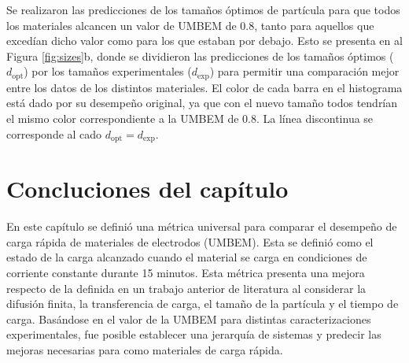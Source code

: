 Se realizaron las predicciones de los tamaños óptimos de partícula para que todos 
los materiales alcancen un valor de UMBEM de 0.8, tanto para aquellos que excedían 
dicho valor como para los que estaban por debajo. Esto se presenta en al Figura 
\ref{fig:sizes}b, donde se dividieron las predicciones de los tamaños óptimos 
($d_{\text{opt}}$) por los tamaños experimentales ($d_{\text{exp}}$) para permitir
una comparación mejor entre los datos de los distintos materiales. El color de 
cada barra en el histograma está dado por su desempeño original, ya que con 
el nuevo tamaño todos tendrían el mismo color correspondiente a la UMBEM de 0.8.
La línea discontinua se corresponde al cado $d_{\text{opt}} = d_{\text{exp}}$.

\section{Concluciones del capítulo}

En este capítulo se definió una métrica universal para comparar el desempeño
de carga rápida de materiales de electrodos (UMBEM). Esta se definió como el estado de la carga 
alcanzado cuando el material se carga en condiciones de corriente constante 
durante 15 minutos. Esta métrica presenta una mejora respecto de la definida en un trabajo anterior de literatura al
considerar la difusión finita, la transferencia de carga, el tamaño de la 
partícula y el tiempo de carga. Basándose en el valor de la UMBEM para distintas 
caracterizaciones experimentales, fue posible establecer una jerarquía de 
sistemas y predecir las mejoras necesarias para  como materiales de 
carga rápida.
